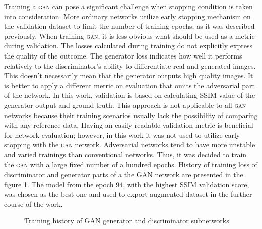 Training a \textsc{gan} can pose a significant challenge when stopping condition is taken into consideration.
More ordinary networks utilize early stopping mechanism on the validation dataset to limit the number of training epochs, as it was described previously.
When training \textsc{gan}, it is less obvious what should be used as a metric during validation.
The losses calculated during training do not explicitly express the quality of the outcome.
The generator loss indicates how well it performs relatively to the discriminator's ability to differentiate real and generated images.
This doesn't necessarily mean that the generator outputs high quality images.
It is better to apply a different metric on evaluation that omits the adversarial part of the network.
In this work, validation is based on calculating SSIM value of the generator output and ground truth.
This approach is not applicable to all \textsc{gan} networks because their training scenarios usually lack the possibility of comparing with any reference data.
Having an easily readable validation metric is beneficial for network evaluation; however, in this work it was not used to utilize early stopping with the \textsc{gan} network.
Adversarial networks tend to have more unstable and varied trainings than conventional networks.
Thus, it was decided to train the \textsc{gan} with a large fixed number of a hundred epochs.
History of training loss of discriminator and generator parts of a the GAN network are presented in the figure \ref{fig:gan-train-hist}.
The model from the epoch 94, with the highest SSIM validation score, was chosen as the best one and used to export augmented dataset in the further course of the work.
\begin{figure}
    \centering
    \caption{Training history of GAN generator and discriminator subnetworks}
    \label{fig:gan-train-hist}
\end{figure}

